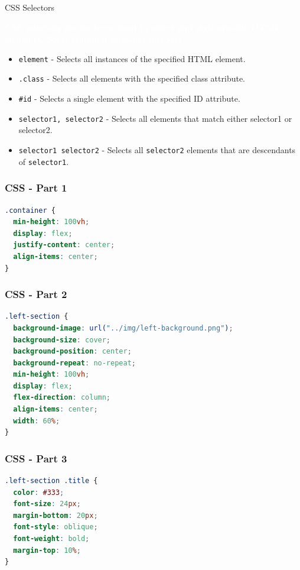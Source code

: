 \documentclass[aspectratio=169, table]{beamer}
\begin{document}
\begin{frame}{CSS Selectors}
    \begin{tcolorbox}[standard jigsaw, opacityback=0, opacityframe=0, sharp corners, boxrule=0pt]
        \textbf{\textcolor{white}{CSS selectors are patterns used to select and style specific HTML elements. Some common selectors include:}}
        \begin{itemize}
            \item \texttt{element} - Selects all instances of the specified HTML element.
            \item \texttt{.class} - Selects all elements with the specified class attribute.
            \item \texttt{\#id} - Selects a single element with the specified ID attribute.
            \item \texttt{selector1, selector2} - Selects all elements that match either selector1 or selector2.
            \item \texttt{selector1 selector2} - Selects all \texttt{selector2} elements that are descendants of \texttt{selector1}.
        \end{itemize}
    \end{tcolorbox}
\end{frame}

\begin{frame}[fragile]
    \frametitle{CSS - Part 1}
    \begin{lstlisting}[language=CSS]
.container {
  min-height: 100vh;
  display: flex;
  justify-content: center;
  align-items: center;
}
    \end{lstlisting}
\end{frame}

\begin{frame}[fragile]
    \frametitle{CSS - Part 2}
    \begin{lstlisting}[language=CSS]
.left-section {
  background-image: url("../img/left-background.png");
  background-size: cover;
  background-position: center;
  background-repeat: no-repeat;
  min-height: 100vh;
  display: flex;
  flex-direction: column;
  align-items: center;
  width: 60%;
}
    \end{lstlisting}
\end{frame}

\begin{frame}[fragile]
    \frametitle{CSS - Part 3}
    \begin{lstlisting}[language=CSS]
.left-section .title {
  color: #333;
  font-size: 24px;
  margin-bottom: 20px;
  font-style: oblique;
  font-weight: bold;
  margin-top: 10%;
}
    \end{lstlisting}
\end{frame}
\end{document}

